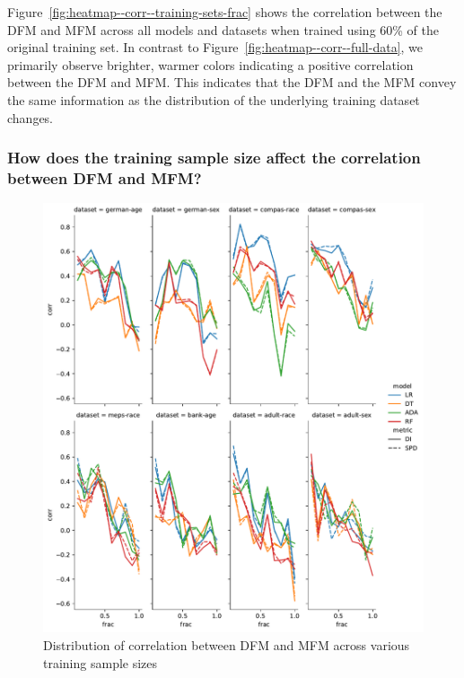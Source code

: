 \documentclass{article}
\begin{document}
Figure \ref{fig:heatmap--corr--training-sets-frac} shows the
correlation between the DFM and MFM across all models and datasets
when trained using 60\% of the original training set. In contrast to
Figure \ref{fig:heatmap--corr--full-data}, we primarily observe
brighter, warmer colors indicating a positive correlation between the
DFM and MFM. This indicates that the DFM and the MFM convey the same
information as the distribution of the underlying training dataset
changes.

\subsubsection{How does the training sample size affect the correlation between DFM and MFM?}\label{sec:results-corr-frac}

\begin{figure}
  \centering
  \includegraphics[width=0.95\linewidth]{lineplot--frac--corr.pdf}
  \caption{Distribution of correlation between DFM and MFM across
    various training sample sizes}
  \label{fig:lineplot--frac--corr}
\end{figure}
\end{document}

